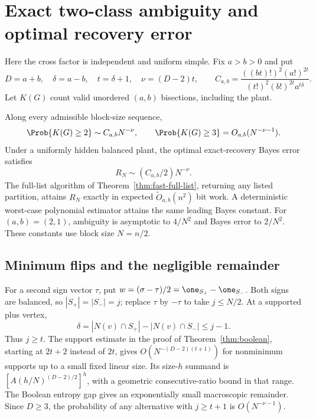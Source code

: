 \section{Exact two-class ambiguity and optimal recovery error}\label{sec:sharp-ambiguity}
Here the cross factor is independent and uniform simple. Fix $a>b>0$ and put
\begin{equation}\label{eq:ambiguity-exponent}
 D=a+b,\quad\delta=a-b,\quad t=\delta+1,\quad\nu=(D-2)t,\qquad
 C_{a,b}=\frac{((bt)!)^2(a!)^{2t}}{(t!)^2(b!)^{2t}a^{t\delta}}.
\end{equation}
Let $K(G)$ count valid unordered $(a,b)$ bisections, including the plant.

\begin{theorem}\label{thm:sharp-ambiguity}
Along every admissible block-size sequence,
\begin{equation}\label{eq:sharp-ambiguity}
 \Prob\{K(G)\ge2\}\sim C_{a,b}N^{-\nu},\qquad
 \Prob\{K(G)\ge3\}=O_{a,b}(N^{-\nu-1}).
\end{equation}
Under a uniformly hidden balanced plant, the optimal exact-recovery
Bayes error satisfies
\[
 R_N\sim(C_{a,b}/2)N^{-\nu}.
\]
The full-list algorithm
of Theorem~\ref{thm:fast-full-list}, returning any listed partition,
attains $R_N$ exactly in expected $\widetilde O_{a,b}(n^2)$ bit work.
A deterministic worst-case polynomial estimator attains the same leading
Bayes constant. For $(a,b)=(2,1)$, ambiguity is asymptotic to $4/N^2$
and Bayes error to $2/N^2$. These constants use block size $N=n/2$.
\end{theorem}

\subsection{Minimum flips and the negligible remainder}
For a second sign vector $\tau$, put
$w=(\sigma-\tau)/2=\one_{S_+}-\one_{S_-}$. Both signs are balanced,
so $|S_+|=|S_-|=j$; replace $\tau$ by $-\tau$ to take $j\le N/2$.
At a supported plus vertex,
\[
 \delta=|N(v)\cap S_+|-|N(v)\cap S_-|\le j-1.
\]
Thus $j\ge t$. The support estimate in the proof of
Theorem~\ref{thm:boolean}, starting at $2t+2$ instead of $2t$, gives
$O(N^{-(D-2)(t+1)})$ for nonminimum supports up to a small fixed
linear size. Its size-$h$ summand is
$[A(h/N)^{(D-2)/2}]^h$, with a geometric consecutive-ratio bound
in that range. The Boolean entropy gap gives an exponentially small
macroscopic remainder. Since $D\ge3$, the probability of any
alternative with $j\ge t+1$ is $O(N^{-\nu-1})$.

